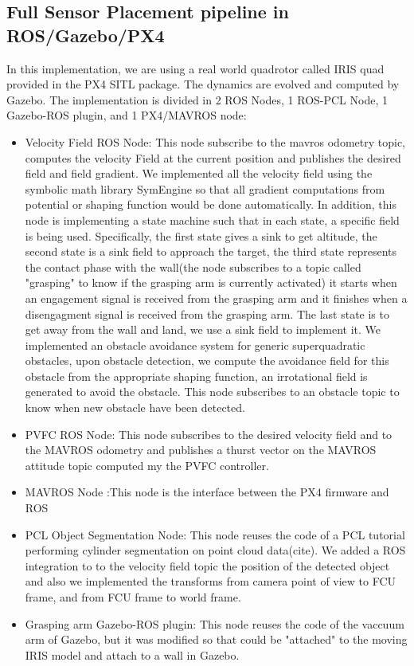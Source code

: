 \subsection*{Full Sensor Placement pipeline in ROS/Gazebo/PX4}
In this implementation, we are using a real world quadrotor called IRIS quad provided in the PX4 SITL package. 
The dynamics are evolved and computed by Gazebo. 
The implementation is divided in 2 ROS Nodes, 1 ROS-PCL Node, 1 Gazebo-ROS plugin, and 1 PX4/MAVROS node:
\begin{itemize}
    \item Velocity Field ROS Node: This node subscribe to the mavros odometry topic, computes the velocity Field at the current position and publishes the desired field and field gradient. 
    We implemented all the velocity field using the symbolic math library SymEngine so that all gradient computations from potential or shaping function would be done automatically. 
    In addition, this node is implementing a state machine such that in each state, a specific field is being used.
    Specifically, the first state gives a sink to get altitude, the second state is a sink field to approach the target, 
    the third state represents the contact phase with the wall(the node subscribes to a topic called "grasping" to know if the grasping arm is currently activated) it starts when an engagement signal is received from the grasping arm and it finishes when a disengagment signal is received from the grasping arm. 
    The last state is to get away from the wall and land, we use a sink field to implement it.
    We implemented an obstacle avoidance system for generic superquadratic obstacles, upon obstacle detection, we compute the avoidance field for this obstacle from the appropriate shaping function, an irrotational field is generated to avoid the obstacle. This node subscribes to an obstacle topic to know when new obstacle have been detected. 
    \item PVFC ROS Node: This node  subscribes to the desired velocity field and to the MAVROS odometry and publishes a thurst vector on the MAVROS attitude topic computed my the PVFC controller.
    \item MAVROS Node :This node is the interface between the PX4 firmware and ROS
    \item PCL Object Segmentation Node: This node reuses the code of a PCL tutorial performing cylinder segmentation on point cloud data(cite). We added a ROS integration to to the velocity field topic the position of the detected object and also we implemented the transforms from camera point of view to FCU frame, and from FCU frame to world frame. 
    \item Grasping arm Gazebo-ROS plugin: This node reuses the code of the vaccuum arm of Gazebo, but it was modified so that could be "attached" to the moving IRIS model and attach to a wall in Gazebo. 
\end{itemize}

